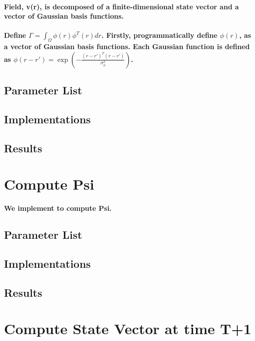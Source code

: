 \documentclass[a4paper, 12pt, english]{article}
\begin{document}
\paragraph{Field, v(r), is decomposed of a finite-dimensional state vector and
a vector of Gaussian basis functions.}

\paragraph{Define $\Gamma=\int_{\Omega}\phi(r)\phi^{T}(r)dr$. Firstly, programmatically
define $\phi(r)$, as a vector of Gaussian basis functions. Each Gaussian
function is defined as $\phi(r-r')=\exp{(-\frac{(r-r')^{T}(r-r')}{\sigma_{\phi}^{2}})}$.}


\subsection{Parameter List}
\subsection{Implementations}
\subsection{Results}

\newpage



\section{Compute Psi}
\paragraph{We implement to compute Psi.}


\subsection{Parameter List}
\subsection{Implementations}
\subsection{Results}

\newpage


\section{Compute State Vector at time T+1}
\label{state vector}
\end{document}
